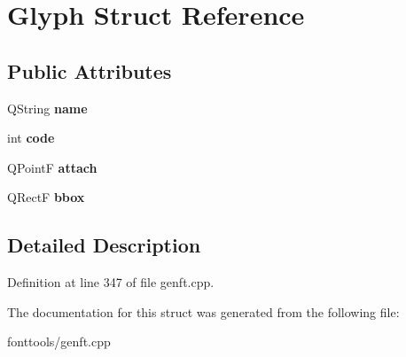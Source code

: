 \hypertarget{struct_glyph}{}\section{Glyph Struct Reference}
\label{struct_glyph}
\subsection*{Public Attributes}
\begin{DoxyCompactItemize}
\item 
\mbox{\label{struct_glyph_aba3b603310de71ed5386106ee93185ea}} 
Q\+String {\bfseries name}
\item 
\mbox{\label{struct_glyph_af103b2d8c5683652a577bd612131d7dc}} 
int {\bfseries code}
\item 
\mbox{\label{struct_glyph_a80f69b3ee5a26bb555516533422b6623}} 
Q\+PointF {\bfseries attach}
\item 
\mbox{\label{struct_glyph_aca71c35cfd3f0fd9c82e2ad2a6a9fc15}} 
Q\+RectF {\bfseries bbox}
\end{DoxyCompactItemize}


\subsection{Detailed Description}


Definition at line 347 of file genft.\+cpp.



The documentation for this struct was generated from the following file\+:\begin{DoxyCompactItemize}
\item 
fonttools/genft.\+cpp\end{DoxyCompactItemize}
